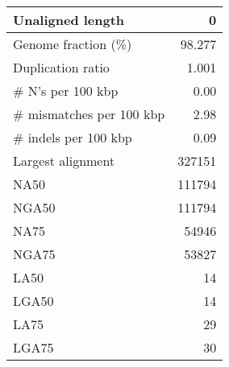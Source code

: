 \documentclass[12pt,a4paper]{article}
\begin{document}
\begin{table}[ht]
\begin{center}
\begin{tabular}{|l*{1}{|r}|}
Unaligned length & 0 \\ \hline
Genome fraction (\%) & 98.277 \\ \hline
Duplication ratio & 1.001 \\ \hline
\# N's per 100 kbp & 0.00 \\ \hline
\# mismatches per 100 kbp & 2.98 \\ \hline
\# indels per 100 kbp & 0.09 \\ \hline
Largest alignment & 327151 \\ \hline
NA50 & 111794 \\ \hline
NGA50 & 111794 \\ \hline
NA75 & 54946 \\ \hline
NGA75 & 53827 \\ \hline
LA50 & 14 \\ \hline
LGA50 & 14 \\ \hline
LA75 & 29 \\ \hline
LGA75 & 30 \\ \hline
\end{tabular}
\end{center}
\end{table}
\end{document}
